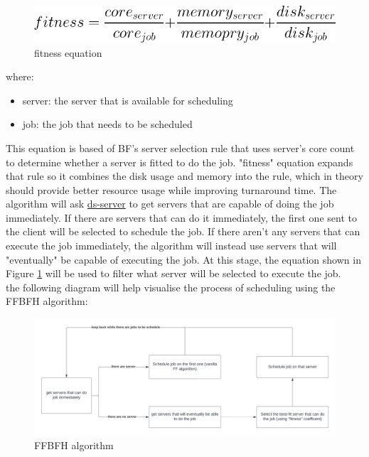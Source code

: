 \documentclass[a4paper]{article} %
\begin{document}
\begin{figure}[h!]
    \centering
    \includegraphics[scale = 0.5]{img/fitness.png}
    \caption{fitness equation}
    \label{fig:fig1}
\end{figure}
where:
\begin{itemize}
    \item server: the server that is available for scheduling
    \item job: the job that needs to be scheduled
\end{itemize}
This equation is based of BF's server selection rule that uses server's core count to determine whether a server is fitted to do the job. "fitness" equation expands that rule so it combines the disk usage and memory into the rule, which in theory should provide better resource usage while improving turnaround time.
The algorithm will ask \href{https://github.com/distsys-MQ/ds-sim}{ds-server} \cite{ds-sim} to get servers that are capable of doing the job immediately. If there are servers that can do it immediately, the first one sent to the client will be selected to schedule the job. If there aren't any servers that can execute the job immediately, the algorithm will instead use servers that will "eventually" be capable of executing the job. At this stage, the equation shown in Figure \ref{fig:fig1} will be used to filter what server will be selected to execute the job.\\
the following diagram will help visualise the process of scheduling using the FFBFH algorithm:
\begin{figure}[h!]
    \centering
    \includegraphics[scale = 0.125]{img/algorithm.png}
    \caption{FFBFH algorithm}
    \label{fig:fig2}
\end{figure}
\end{document}
